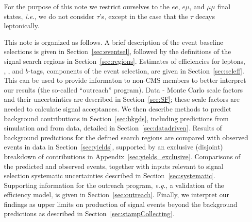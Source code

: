  
For the purpose of this note we restrict ourselves to the $ee$, $e\mu$, and $\mu\mu$ 
final states, {\em i.e.}, we do not consider $\tau$'s, except in the case that the $\tau$ decays leptonically.

This note is organized as follows.
A brief description of the event baseline selections is given in Section~\ref{sec:eventsel},
followed by the definitions of the signal search regions in Section~\ref{sec:regions}.
Estimates of efficiencies for leptons, \met, \Ht, and $b$-tags, components of the event selection,
are given in Section~\ref{sec:seleff}.  This can be used to provide
informaton to non-CMS members to better interpret our results (the so-called
``outreach'' program).
Data - Monte Carlo scale factors and their uncertainties are described
in Section~\ref{sec:SF}; these scale factors are needed to 
calculate signal acceptances.
We then describe methods to predict background contributions in Section~\ref{sec:bkgds},
including predictions from simulation and from data, detailed in Section~\ref{sec:datadriven}.
Results of background predictions for the defined search regions are compared with 
observed events in data in Section~\ref{sec:yields},
supported by an exclusive (disjoint) breakdown of contributions in Appendix~\ref{sec:yields_exclusive}.
Comparisons of the predicted and observed events, together with inputs relevant
to signal selection systematic uncertainties described in Section~\ref{sec:systematic}.  Supporting information for the outreach program, {\it e.g.},
a validation of the efficiency model, is given in Section~\ref{sec:outreach}.
Finally, we interpret our findings as upper limits on 
production of signal events beyond
the background predictions as described in Section~\ref{sec:stampCollecting}.






